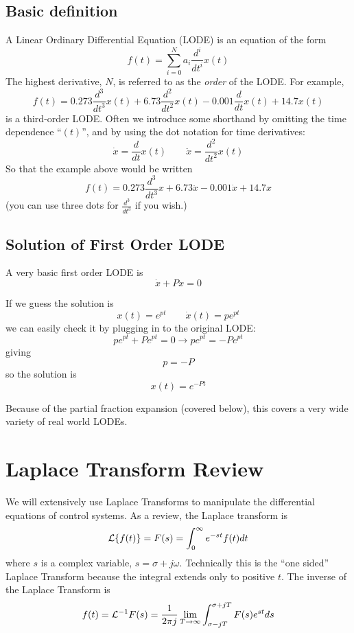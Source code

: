 \subsection{Basic definition}

A Linear Ordinary Differential Equation (LODE) is an equation of the form
\[
f(t) = \sum_{i=0}^{N} a_i\frac{d^i}{dt^i}x(t)
\]
The highest derivative, $N$, is referred to as the {\it order} of the LODE.  For example,
\[
f(t) = 0.273\frac{d^3}{dt^3}x(t) + 6.73\frac{d^2}{dt^2}x(t) - 0.001\frac{d}{dt}x(t) + 14.7x(t)
\]
is a third-order LODE.   Often we introduce some shorthand by omitting the time dependence ``$(t)$'', and by using the dot notation for time derivatives:
\[
\dot{x} = \frac{d}{dt}x(t)  \qquad \ddot{x} = \frac{d^2}{dt^2}x(t)
\]
So that the example above would be written
\[
f(t) =0.273\frac{d^3}{dt^3}x + 6.73\ddot{x} - 0.001\dot{x} + 14.7x
\]
(you can use three dots for $\frac{d^3}{dt^3}$ if you wish.)



\subsection{Solution of First Order LODE}

A very basic  first order LODE is
\[
\dot{x} + Px = 0
\]

If we guess the solution is
\[
x(t) = e^{pt} \qquad \dot{x}(t) = pe^{pt}
\]
we can easily check it by plugging in to the original LODE:
\[
pe^{pt} +Pe^{pt} = 0 \to pe^{pt} = -Pe^{pt}
\]
giving
\[
p = -P
\]
so the solution is
\[
x(t) = e^{-Pt}
\]

Because of the partial fraction expansion (covered below), this covers a very wide variety of real world LODEs.


\section{Laplace Transform Review}

We will extensively use Laplace Transforms to manipulate the differential equations of control systems.  As a review, the Laplace transform is
\[
\mathcal{L} \{f(t)\} = F(s) =  \int_{0}^{\infty} e^{-st}f(t)dt
\]
where $s$ is a complex variable, $s=\sigma + j \omega$.  Technically this is the ``one sided'' Laplace Transform because the integral extends only to positive $t$.
The inverse of the Laplace Transform is
\[
f(t) = \mathcal{L}^{-1}F(s) = \frac{1}{2\pi j} \lim_{T\to\infty} \int_{\sigma - j T}^{\sigma + jT}F(s) e^{st}ds
\]

